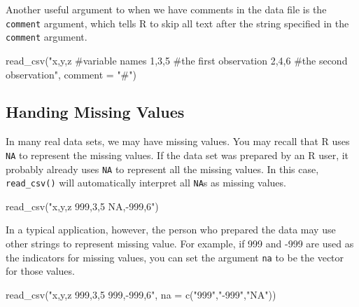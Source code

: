 \documentclass[
]{book}
\newenvironment{Shaded}{\begin{snugshade}}{\end{snugshade}}
\newcommand{\AttributeTok}[1]{\textcolor[rgb]{0.77,0.63,0.00}{#1}}
\newcommand{\FunctionTok}[1]{\textcolor[rgb]{0.00,0.00,0.00}{#1}}
\newcommand{\NormalTok}[1]{#1}
\newcommand{\StringTok}[1]{\textcolor[rgb]{0.31,0.60,0.02}{#1}}
\begin{document}
Another useful argument to when we have comments in the data file is the \texttt{comment} argument, which tells R to skip all text after the string specified in the \texttt{comment} argument.

\begin{Shaded}
\begin{Highlighting}[]
\FunctionTok{read\_csv}\NormalTok{(}\StringTok{"x,y,z \#variable names}
\StringTok{         1,3,5 \#the first observation}
\StringTok{         2,4,6 \#the second observation"}\NormalTok{, }\AttributeTok{comment =} \StringTok{"\#"}\NormalTok{)}
\end{Highlighting}
\end{Shaded}

\hypertarget{handing-missing-values}{%
\subsection{Handing Missing Values}\label{handing-missing-values}}

In many real data sets, we may have missing values. You may recall that R uses \texttt{NA} to represent the missing values. If the data set was prepared by an R user, it probably already uses \texttt{NA} to represent all the missing values. In this case, \texttt{read\_csv()} will automatically interpret all \texttt{NA}s as missing values.

\begin{Shaded}
\begin{Highlighting}[]
\FunctionTok{read\_csv}\NormalTok{(}\StringTok{"x,y,z}
\StringTok{          999,3,5}
\StringTok{         NA,{-}999,6"}\NormalTok{)}
\end{Highlighting}
\end{Shaded}

In a typical application, however, the person who prepared the data may use other strings to represent missing value. For example, if 999 and -999 are used as the indicators for missing values, you can set the argument \texttt{na} to be the vector for those values.

\begin{Shaded}
\begin{Highlighting}[]
\FunctionTok{read\_csv}\NormalTok{(}\StringTok{"x,y,z}
\StringTok{          999,3,5}
\StringTok{         999,{-}999,6"}\NormalTok{, }\AttributeTok{na =} \FunctionTok{c}\NormalTok{(}\StringTok{"999"}\NormalTok{,}\StringTok{"{-}999"}\NormalTok{,}\StringTok{"NA"}\NormalTok{))}
\end{Highlighting}
\end{Shaded}
\end{document}
